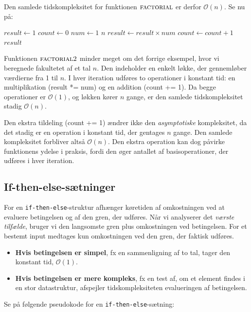Den samlede tidskompleksitet for funktionen $\proc{factorial}$ er derfor $\mathcal{O}(n)$. Se nu på:

\begin{codebox}
    \li $result \gets 1$
    \li $count \gets 0$
    \li \For $num \gets 1$ \To $n$ \Do
    \li     $result \gets result \times num$
    \li     $count \gets count + 1$
        \End
    \li \Return $result$
\end{codebox}

Funktionen $\proc{factorial2}$ minder meget om det forrige eksempel, hvor vi beregnede fakultetet af et tal \( n \). Den indeholder en enkelt løkke, der gennemløber værdierne fra 1 til \( n \). I hver iteration udføres to operationer i konstant tid: en multiplikation (result *= num) og en addition (count += 1). Da begge operationer er \(\mathcal{O}(1)\), og løkken kører \( n \) gange, er den samlede tidskompleksitet stadig \(\mathcal{O}(n)\).

Den ekstra tildeling (count += 1) ændrer ikke den \textit{asymptotiske} kompleksitet, da det stadig er en operation i konstant tid, der gentages \( n \) gange. Den samlede kompleksitet forbliver altså \(\mathcal{O}(n)\). Den ekstra operation kan dog påvirke funktionens ydelse i praksis, fordi den øger antallet af basisoperationer, der udføres i hver iteration.

\subsection*{If-then-else-sætninger}
For en \texttt{if-then-else}-struktur afhænger køretiden af omkostningen ved at evaluere betingelsen og af den gren, der udføres. Når vi analyserer det \emph{værste tilfælde}, bruger vi den langsomste gren plus omkostningen ved betingelsen. For et bestemt input medtages kun omkostningen ved den gren, der faktisk udføres.

\begin{itemize}
    \item \textbf{Hvis betingelsen er simpel}, fx en sammenligning af to tal, tager den konstant tid, $\mathcal{O}(1)$.
    \item \textbf{Hvis betingelsen er mere kompleks}, fx en test af, om et element findes i en stor datastruktur, afspejler tidskompleksiteten evalueringen af betingelsen.
\end{itemize}

Se på følgende pseudokode for en \texttt{if-then-else}-sætning:

